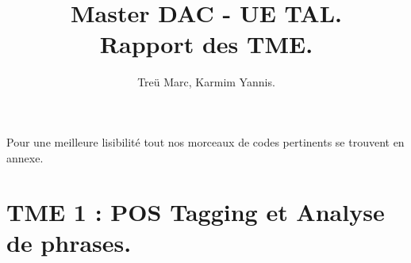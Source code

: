 \documentclass{article}
\title{Master DAC  - UE TAL.\\Rapport des TME.}
\author{Treü Marc, Karmim Yannis.}
\begin{document}
\maketitle
\clearpage
\tableofcontents
\clearpage
Pour une meilleure lisibilité tout nos morceaux de codes pertinents se trouvent en annexe. 
\section{TME 1 : POS Tagging et Analyse de phrases.}
\end{document}
